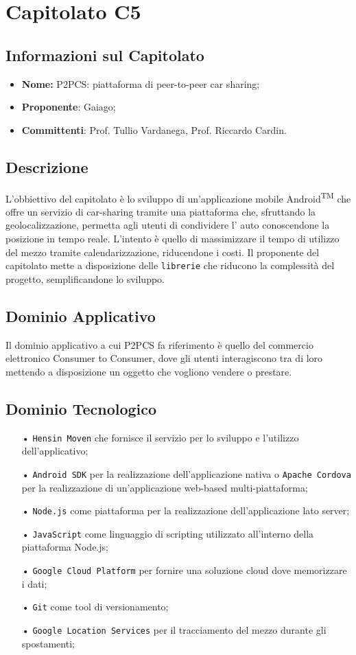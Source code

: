 \section{Capitolato C5}
\subsection{Informazioni sul Capitolato}
\begin{itemize}
	\item \textbf{Nome:} P2PCS: piattaforma di peer-to-peer car sharing;
	\item \textbf{Proponente}: Gaiago;
	\item \textbf{Committenti}: Prof. Tullio Vardanega, Prof. Riccardo Cardin.
\end{itemize}
\subsection{Descrizione}
L'obbiettivo del capitolato è lo sviluppo di un'applicazione mobile Android\textsuperscript{TM} che offre un servizio di 
car-sharing tramite una piattaforma che, sfruttando la geolocalizzazione, permetta agli utenti di condividere l' auto conoscendone la posizione in tempo reale. 
L'intento è quello di massimizzare il tempo di utilizzo del mezzo tramite calendarizzazione, 
riducendone i costi. 
Il proponente del capitolato mette a disposizione delle \texttt{librerie} che riducono la 
complessità del progetto, semplificandone lo sviluppo.

\subsection{Dominio Applicativo}
Il dominio applicativo a cui P2PCS fa riferimento è quello del commercio elettronico Consumer to Consumer, dove gli utenti interagiscono tra di loro mettendo a disposizione un oggetto che vogliono vendere o prestare.

\subsection{Dominio Tecnologico}
\begin{itemize}
\item[•] \texttt{Hensin Moven} che fornisce il servizio per lo sviluppo e l'utilizzo dell'applicativo;
\item[•] \texttt{Android SDK} per la realizzazione dell'applicazione nativa o \texttt{Apache Cordova} per
 la realizzazione di un'applicazione web-based multi-piattaforma;
\item[•] \texttt{Node.js} come piattaforma per la realizzazione dell'applicazione lato server;
\item[•] \texttt{JavaScript} come linguaggio di scripting utilizzato all'interno della piattaforma Node.js;
\item[•] \texttt{Google Cloud Platform} per fornire una soluzione cloud dove memorizzare i dati;
\item[•] \texttt{Git} come tool di versionamento;
\item[•] \texttt{Google Location Services} per il tracciamento del mezzo durante gli spostamenti;
\end{itemize}

